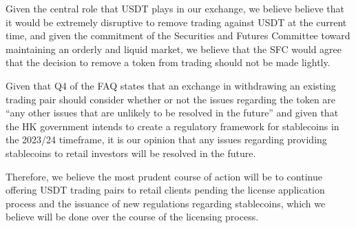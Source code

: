 Given the central role that USDT plays in our exchange, we believe
believe that it would be extremely disruptive to remove trading
against USDT at the current time, and given the commitment of the
Securities and Futures Committee toward maintaining an orderly and
liquid market, we believe that the SFC would agree that the decision
to remove a token from trading should not be made lightly.

Given that Q4 of the FAQ states that an exchange in withdrawing an
existing trading pair should consider whether or not the issues
regarding the token are ``any other issues that are unlikely to be
resolved in the future'' and given that the HK government intends to
create a regulatory framework for stablecoins in the 2023/24
timeframe, it is our opinion that any issues regarding providing
stablecoins to retail investors will be resolved in the future.

Therefore, we believe the most prudent course of action will be to
continue offering USDT trading pairs to retail clients pending the
license application process and the issuance of new regulations
regarding stablecoins, which we believe will be done over the course
of the licensing process.







